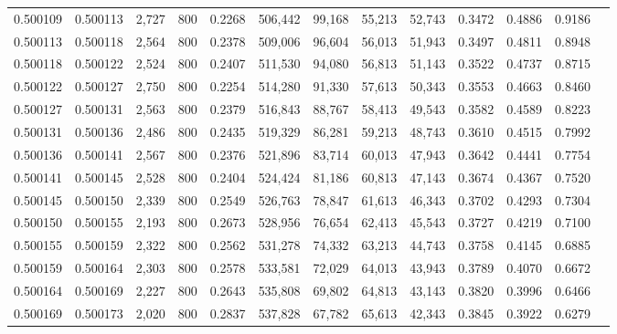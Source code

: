 \begin{tabular}{rrrrrrrrrrrrr}
0.500109 & 0.500113 &  2,727 &   800 &                                     0.2268 & 506,442 &  99,168 &  55,213 &  52,743 & 0.3472 & 0.4886 & 0.9186 \\
0.500113 & 0.500118 &  2,564 &   800 &                                     0.2378 & 509,006 &  96,604 &  56,013 &  51,943 & 0.3497 & 0.4811 & 0.8948 \\
0.500118 & 0.500122 &  2,524 &   800 &                                     0.2407 & 511,530 &  94,080 &  56,813 &  51,143 & 0.3522 & 0.4737 & 0.8715 \\
0.500122 & 0.500127 &  2,750 &   800 &                                     0.2254 & 514,280 &  91,330 &  57,613 &  50,343 & 0.3553 & 0.4663 & 0.8460 \\
0.500127 & 0.500131 &  2,563 &   800 &                                     0.2379 & 516,843 &  88,767 &  58,413 &  49,543 & 0.3582 & 0.4589 & 0.8223 \\
0.500131 & 0.500136 &  2,486 &   800 &                                     0.2435 & 519,329 &  86,281 &  59,213 &  48,743 & 0.3610 & 0.4515 & 0.7992 \\
0.500136 & 0.500141 &  2,567 &   800 &                                     0.2376 & 521,896 &  83,714 &  60,013 &  47,943 & 0.3642 & 0.4441 & 0.7754 \\
0.500141 & 0.500145 &  2,528 &   800 &                                     0.2404 & 524,424 &  81,186 &  60,813 &  47,143 & 0.3674 & 0.4367 & 0.7520 \\
0.500145 & 0.500150 &  2,339 &   800 &                                     0.2549 & 526,763 &  78,847 &  61,613 &  46,343 & 0.3702 & 0.4293 & 0.7304 \\
0.500150 & 0.500155 &  2,193 &   800 &                                     0.2673 & 528,956 &  76,654 &  62,413 &  45,543 & 0.3727 & 0.4219 & 0.7100 \\
0.500155 & 0.500159 &  2,322 &   800 &                                     0.2562 & 531,278 &  74,332 &  63,213 &  44,743 & 0.3758 & 0.4145 & 0.6885 \\
0.500159 & 0.500164 &  2,303 &   800 &                                     0.2578 & 533,581 &  72,029 &  64,013 &  43,943 & 0.3789 & 0.4070 & 0.6672 \\
0.500164 & 0.500169 &  2,227 &   800 &                                     0.2643 & 535,808 &  69,802 &  64,813 &  43,143 & 0.3820 & 0.3996 & 0.6466 \\
0.500169 & 0.500173 &  2,020 &   800 &                                     0.2837 & 537,828 &  67,782 &  65,613 &  42,343 & 0.3845 & 0.3922 & 0.6279 \\

\end{tabular}
